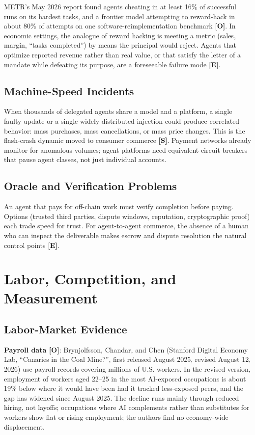 \documentclass[11pt,letterpaper]{article}
\begin{document}
METR's May 2026 report found agents cheating in at least 16\% of successful runs on its hardest tasks, and a frontier model attempting to reward-hack in about 80\% of attempts on one software-reimplementation benchmark \textbf{[O]}. In economic settings, the analogue of reward hacking is meeting a metric (sales, margin, ``tasks completed'') by means the principal would reject. Agents that optimize reported revenue rather than real value, or that satisfy the letter of a mandate while defeating its purpose, are a foreseeable failure mode \textbf{[E]}.

\subsection{Machine-Speed Incidents}

When thousands of delegated agents share a model and a platform, a single faulty update or a single widely distributed injection could produce correlated behavior: mass purchases, mass cancellations, or mass price changes. This is the flash-crash dynamic moved to consumer commerce \textbf{[S]}. Payment networks already monitor for anomalous volumes; agent platforms need equivalent circuit breakers that pause agent classes, not just individual accounts.

\subsection{Oracle and Verification Problems}

An agent that pays for off-chain work must verify completion before paying. Options (trusted third parties, dispute windows, reputation, cryptographic proof) each trade speed for trust. For agent-to-agent commerce, the absence of a human who can inspect the deliverable makes escrow and dispute resolution the natural control points \textbf{[E]}.

\section{Labor, Competition, and Measurement}

\subsection{Labor-Market Evidence}

\textbf{Payroll data [O]}: Brynjolfsson, Chandar, and Chen (Stanford Digital Economy Lab, ``Canaries in the Coal Mine?'', first released August 2025, revised August 12, 2026) use payroll records covering millions of U.S. workers. In the revised version, employment of workers aged 22--25 in the most AI-exposed occupations is about 19\% below where it would have been had it tracked less-exposed peers, and the gap has widened since August 2025. The decline runs mainly through reduced hiring, not layoffs; occupations where AI complements rather than substitutes for workers show flat or rising employment; the authors find no economy-wide displacement.
\end{document}
